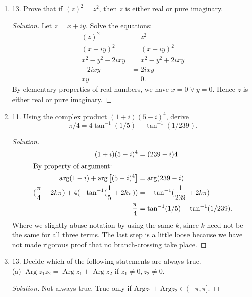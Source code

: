 \begin{enumerate}
\begin{proof}[Solution]
Let $z = x + i y$. Solve the equations:
\begin{align*}
	\sqrt{(x-1)^2+y^2}+\sqrt{(x+1)^2+y^2}&=7\\  	
	\sqrt{(x-1)^2+y^2}&=7-\sqrt{(x+1)^2+y^2}\\  	
	(x-1)^2+y^2&=49-14\sqrt{(x+1)^2+y^2}+(x+1)^2+y^2\\  	
	14\sqrt{(x+1)^2+y^2}&=49+4x\\  	
	14^2((x+1)^2+y^2)&=49^2+16x^2+49\cdot 8x\\  	
	(x+1)^2+y^2&=\frac{49}{4}+\frac{4}{49}x^2+ 2x\\  	
	\frac{45}{49}x^2+y^2&=\frac{45}{4}  	
.\end{align*}
\end{proof}
	\item 13. Prove that if $(\bar{z})^{2}=z^{2}$, then $z$ is either real or pure imaginary.
\begin{proof}[Solution]
Let $z = x + i y$. Solve the equations:
\begin{align*}
	(\overline{z})^2 &= z^2\\
	(x-iy)^2 &= (x+iy)^2\\
	x^2-y^2-2ixy &= x^2-y^2+2ixy\\
	-2ixy &= 2ixy\\
	xy &= 0
.\end{align*}
By elementary properties of real numbers, we have $x=0 \lor y=0$. Hence $z $ is either real or pure imaginary.
\end{proof}
	\item 11. Using the complex product $(1+i)(5-i)^{4}$, derive
\[
\pi / 4=4 \tan ^{-1}(1 / 5)-\tan ^{-1}(1 / 239) .
\]
\begin{proof}[Solution]
\begin{align*}
	(1+i)(5-i)^4&= (239-i)4\\
	\intertext{By property of argument:}
	\text{arg}(1+i)+\text{arg}\left[(5-i)^4\right]&= \text{arg}(239-i)\\
	(\frac{\pi}{4}+2k\pi) +
	4(-\tan^{-1}(\frac{1}{5}+2k\pi))
	&= -\tan^{-1}(\frac{1}{239}+2k\pi)\\
	\frac{\pi}{4} &=  \tan ^{-1}(1 / 5)-\tan ^{-1}(1 / 239) 
.\end{align*}
Where we slightly abuse notation by using the same $k$, since $k$ need not be the same for all three terms.
The last step is a little loose because we have not made rigorous proof that no branch-crossing take place.
\end{proof}
	\item 13. Decide which of the following statements are always true.\\
(a) $\operatorname{Arg} z_{1} z_{2}=\operatorname{Arg} z_{1}+\operatorname{Arg} z_{2}$ if $z_{1} \neq 0, z_{2} \neq 0$.
\begin{proof}[Solution]
	Not always true. True only if $\text{Arg}z_1 + \text{Arg}z_2 \in (-\pi,\pi]$.
\end{proof}


\end{enumerate}
